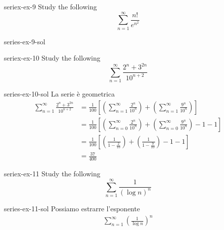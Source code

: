 \documentclass[preview]{standalone}
\begin{document}
\begin{snippetexercise}{seriex-ex-9}{}
    Study the following \series
    \[
        \sum_{n=1}^\infty \frac{
            n!
        }{
            e^{n^2}
        }
    \]
\end{snippetexercise}

\begin{snippetsolution}{series-ex-9-sol}{}
    \todo
\end{snippetsolution}

\begin{snippetexercise}{seriex-ex-10}{}
    Study the following \series
    \[
        \sum_{n=1}^\infty \frac{
            2^n + 3^{2n}
        }{
            10^{n+2}
        }
    \]
\end{snippetexercise}

\begin{snippetsolution}{series-ex-10-sol}{}
    La serie è geometrica
    \begin{align*}
        \sum_{n=1}^\infty \frac{
            2^n + 3^{2n}
        }{
            10^{n+2}
        } &=
        \frac{1}{100} \left[
            \left(\sum_{n=1}^\infty \frac{
            2^n
        }{
            10^{n}
        }\right)
        +
        \left(\sum_{n=1}^\infty \frac{
            9^{n}
        }{
            10^{n}
        }\right)
        \right]
        \\
        &= 
        \frac{1}{100} \left[
            \left(\sum_{n=0}^\infty \frac{
            2^n
        }{
            10^{n}
        }\right)
        +
        \left(\sum_{n=0}^\infty \frac{
            9^{n}
        }{
            10^{n}
        }\right)
        -1-1
        \right]
        \\
        &= 
        \frac{1}{100} \left[
            \left(\frac{1}{1 - \frac{2}{10}}\right)
        +
        \left(\frac{1}{1 - \frac{9}{10}}\right)
        -1-1
        \right] \\
        &= \frac{37}{400}
    \end{align*}
\end{snippetsolution}

\begin{snippetexercise}{seriex-ex-11}{}
    Study the following \series
    \[
        \sum_{n=1}^\infty \frac{
            1
        }{
            {(\log n)}^n
        }
    \]
\end{snippetexercise}

\begin{snippetsolution}{series-ex-11-sol}{}
    Possiamo estrarre l'esponente
    \begin{align*} %
        \sum_{n=1}^\infty {\left(\frac{
            1
        }{
            \log n
        }\right)}^n
    \end{align*}
    \todo
\end{snippetsolution}
\end{document}
